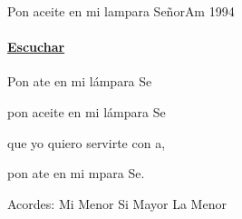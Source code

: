 \documentclass[12pt, spanish]{book}
\begin{document}
    \begin{song}{Pon aceite en mi lampara Señor}{Am}
        {1994} %
        {}
        {} %
        {}
    \ifChordBk
    \paragraph{\mbox{}\hfill\protect\href{https://open.spotify.com/intl-es/track/5BrLQDeHMeNF6pScfXNXb1}{Escuchar}\mbox{}\hfill}
    \fi


    \begin{SBOpGroup}
        Pon ate en mi lámpara Se

        pon aceite en mi lámpara Se

        que yo quiero servirte con a,

        pon ate en mi mpara Se.
    \end{SBOpGroup}

    \ifChordBk
    \begin{SBOpGroup}
        Acordes:\break
        \upchord{\Em}\qquad Mi Menor \hfill
        \upchord{\B}\qquad\qquad Si Mayor \hfill\null\break
        \upchord{\Am}\qquad La Menor \hfill
    \end{SBOpGroup}
    \fi
    \end{song}
\end{document}
